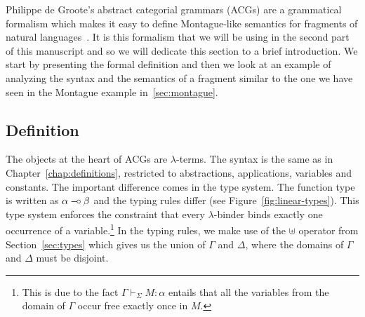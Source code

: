 Philippe de Groote's abstract categorial grammars (ACGs) are a grammatical
formalism which makes it easy to define Montague-like semantics for
fragments of natural languages~\cite{de2001towards}. It is this formalism
that we will be using in the second part of this manuscript and so we will
dedicate this section to a brief introduction. We start by presenting the
formal definition and then we look at an example of analyzing the syntax
and the semantics of a fragment similar to the one we have seen in the
Montague example in~\ref{sec:montague}.


\subsection{Definition}
\label{ssec:acg-definition}

The objects at the heart of ACGs are $\lambda$-terms. The syntax is the
same as in Chapter~\ref{chap:definitions}, restricted to abstractions,
applications, variables and constants. The important difference comes in
the type system. The function type is written as $\alpha \mathbin{{-}\mkern-3.5mu{\circ}} \beta$ and
the typing rules differ (see Figure~\ref{fig:linear-types}). This type
system enforces the constraint that every $\lambda$-binder binds exactly
one occurrence of a variable.\footnote{This is due to the fact
  $\Gamma \vdash_\Sigma M : \alpha$ entails that all the variables from the
  domain of $\Gamma$ occur free exactly once in $M$.} In the typing rules,
we make use of the $\uplus$ operator from Section~\ref{sec:types} which
gives us the union of $\Gamma$ and $\Delta$, where the domains of $\Gamma$
and $\Delta$ must be disjoint.

